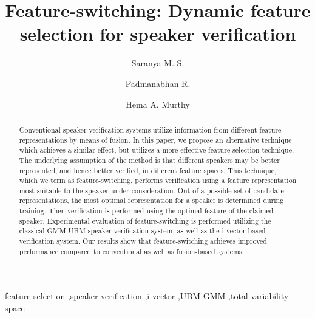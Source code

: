 \documentclass[preprint,12pt,5p]{elsarticle}
\begin{document}
\sloppy
\flushend

\begin{frontmatter}

\title{ {\bf Feature-switching: Dynamic feature selection for speaker verification}}

\author[label1]{Saranya M. S.}
\address[label1]{Indian Institute of Technology Madras}


\author[label2]{Padmanabhan R.}
\address[label2]{Indian Institute of Technology Mandi}

\author[label1]{Hema A. Murthy}

\begin{abstract}
Conventional speaker verification systems utilize information from different
feature representations by means of fusion. In this paper, we propose an
alternative technique which achieves a similar effect, but 
utilizes a more effective feature selection technique. The underlying assumption of the 
method is that different speakers may be better represented, and hence better 
verified, in different feature spaces.  This technique, which we term as feature-switching, 
performs verification using a feature representation most suitable to the
speaker under consideration. %
Out of a possible set of candidate representations, the most optimal
representation for a speaker is determined during training. Then verification is
performed using the optimal feature of the claimed speaker. Experimental evaluation
of feature-switching is performed utilizing the classical GMM-UBM speaker
verification system, as well as the i-vector-based verification system. Our results show
that feature-switching achieves improved performance compared to conventional as well
as fusion-based systems.
\end{abstract}

\begin{keyword}
feature selection  \sep speaker verification \sep i-vector \sep UBM-GMM \sep total variability space 
\end{keyword}

\end{frontmatter}
\end{document}
